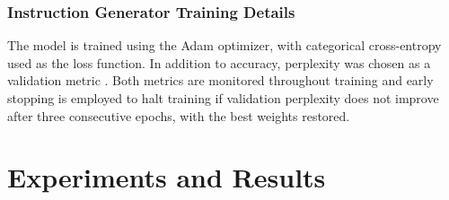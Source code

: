 \documentclass[10pt,twocolumn,letterpaper]{article}
\begin{document}








\subsubsection{Instruction Generator Training Details}
The model is trained using the Adam optimizer, with categorical cross-entropy used as the loss function. In addition to accuracy, perplexity was chosen as a validation metric 
\cite{10.1121/1.2016299_orig_4}. Both metrics are monitored throughout training and early stopping is employed to halt training if validation perplexity does not improve after three consecutive epochs, with the best weights restored.

\section{Experiments and Results}
\end{document}
